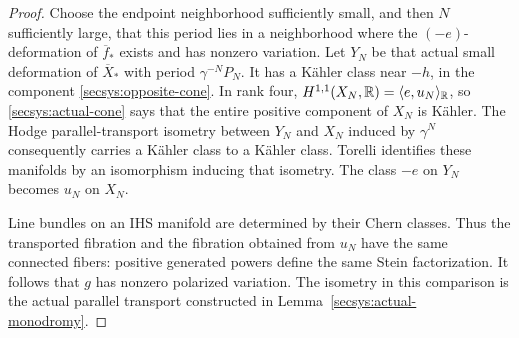 \begin{proof}
Choose the endpoint neighborhood sufficiently small, and then $N$
sufficiently large, that this period lies in a neighborhood where the
$(-e)$-deformation of $\overline f_*$ exists and has nonzero variation.
Let $Y_N$ be that actual small deformation of $\overline X_*$ with
period $\gamma^{-N}P_N$.  It has a K\"ahler class near $-h$, in the
component \eqref{secsys:opposite-cone}.  In rank four,
$H^{1,1}(X_N,\mathbb R)=\langle e,u_N\rangle_{\mathbb R}$, so
\eqref{secsys:actual-cone} says that the entire positive component
of $X_N$ is K\"ahler.  The Hodge parallel-transport isometry between
$Y_N$ and $X_N$ induced by $\gamma^N$ consequently carries a
K\"ahler class to a K\"ahler class.  Torelli identifies these
manifolds by an isomorphism inducing that isometry.  The class $-e$
on $Y_N$ becomes $u_N$ on $X_N$.

Line bundles on an IHS manifold are determined by their Chern
classes.  Thus the transported fibration and the fibration obtained
from $u_N$ have the same connected fibers: positive generated powers
define the same Stein factorization.  It follows that $g$ has nonzero
polarized variation.  The isometry in this comparison is the actual
parallel transport constructed in Lemma~\ref{secsys:actual-monodromy}.
\end{proof}
